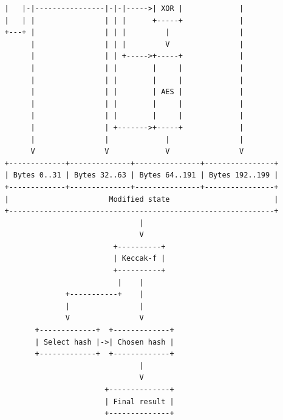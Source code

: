 \begin{verbatim}
   |   |-|----------------|-|-|----->| XOR |             |
   |   | |                | | |      +-----+             |
   +---+ |                | | |         |                |
         |                | | |         V                |
         |                | | +----->+-----+             |
         |                | |        |     |             |
         |                | |        |     |             |
         |                | |        | AES |             |
         |                | |        |     |             |
         |                | |        |     |             |
         |                | +------->+-----+             |
         |                |             |                |
         V                V             V                V
   +-------------+--------------+---------------+----------------+
   | Bytes 0..31 | Bytes 32..63 | Bytes 64..191 | Bytes 192..199 |
   +-------------+--------------+---------------+----------------+
   |                       Modified state                        |
   +-------------------------------------------------------------+
                                  |
                                  V
                            +----------+
                            | Keccak-f |
                            +----------+
                             |    |
                 +-----------+    |
                 |                |
                 V                V
          +-------------+  +-------------+
          | Select hash |->| Chosen hash |
          +-------------+  +-------------+
                                  |
                                  V
                          +--------------+
                          | Final result |
                          +--------------+
\end{verbatim}